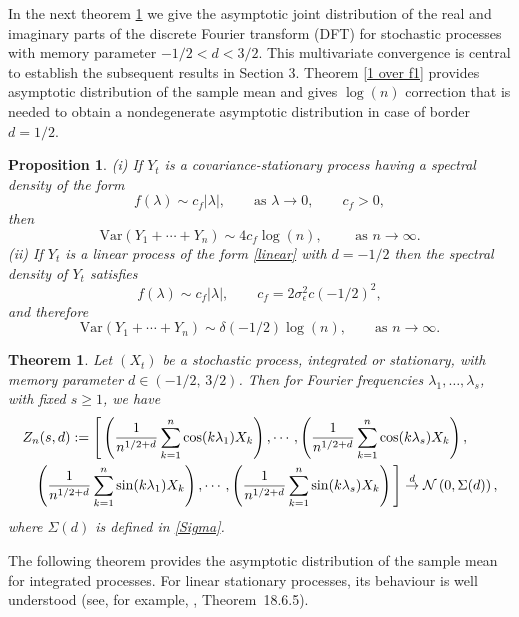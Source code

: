 \documentclass[12pt]{article}
\numberwithin{equation}{section}
\newtheorem{thm}{Theorem}[section]
\newtheorem{prop}{Proposition}[section]
\begin{document}
In the next theorem \ref{finite dim}  we give the  asymptotic
joint distribution of the real and imaginary parts of the discrete Fourier transform (DFT) for stochastic processes  with memory parameter $-1/2<d<3/2$. This multivariate convergence is central to establish the subsequent results in Section 3. Theorem \ref{1 over f1}  provides asymptotic distribution of the sample mean and gives $\log(n)$ correction that is needed to obtain a nondegenerate asymptotic distribution in case of border $d=1/2$.
\begin{prop}
     \label{unit root1} (i) If $Y_t$ is a covariance-stationary process having a spectral density of the form
$$
f(\lambda)\sim c_f\vert\lambda\vert,\qquad\textrm{as }\lambda\to0,\qquad c_f>0,
$$
then
$$
\textrm{Var}(Y_1+\cdots+Y_n)\sim 4c_f\log(n),\qquad\textrm{ as }n\to\infty.
$$
(ii) If $Y_t$ is a linear process of the form \eqref{linear} with $d=-1/2$
   then the  spectral density of $Y_t$ satisfies
$$
f(\lambda)\sim c_f\vert\lambda\vert,\qquad c_f=2\sigma^2_\epsilon c(-1/2)^2,
$$
and therefore
\begin{equation}\label{var sum 1/2}
    \textrm{Var}(Y_1+\cdots+Y_n)\sim\delta(-1/2)\log(n),\qquad\textrm{as }n\to\infty.
\end{equation}
\end{prop}
\begin{thm}
\label{finite dim} 
Let $(X_t)$ be a stochastic process, integrated or stationary, with memory parameter $d \in (-1/2,\,3/2)$. Then for  Fourier frequencies  $\lambda_1,\ldots,\lambda_s$, with fixed $s\ge1$, we have 
\begin{eqnarray*}\lefteqn{
Z_n(s,d):=\Bigg[\left(\frac{1}{n^{1/2+d}}\sum_{k=1}^n\cos(k\lambda_{1})X_k\right),
\cdots,\left(\frac{1}{n^{1/2+d}}\sum_{k=1}^n\cos(k\lambda_{s})X_k\right),}\nonumber\\
&& \left(\frac{1}{n^{1/2+d}}\sum_{k=1}^n\sin(k\lambda_1)X_k\right),\cdots,\left(\frac{1}{n^{1/2+d}}\sum_{k=1}^n\sin(k\lambda_{s})X_k\right)\Bigg]\overset{d}{\rightarrow}\mathcal{N}\left(0,\Sigma(d)\right), 
\end{eqnarray*}
where $\Sigma(d)$ is defined in \eqref{Sigma}.
\end{thm}
The following theorem provides the asymptotic distribution of the sample mean for integrated processes. For  linear stationary processes, its behaviour is well understood (see, for example, \cite{ibragimov_linnik_1971}, Theorem~18.6.5).
\end{document}
